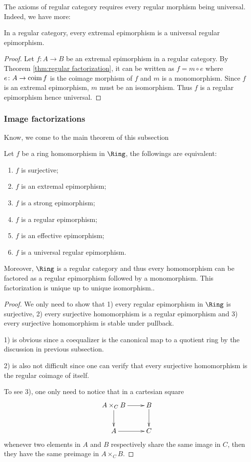   The axioms of regular category requires every regular morphism being universal. Indeed, we have more:
  \begin{cor}\label{cor:regularCat}
    In a regular category, every extremal epimorphism is a universal regular epimorphism.
  \end{cor}
  \begin{proof}
    Let $f\colon A\to B$ be an extremal epimorphism in a regular category. By Theorem \ref{thm:regular factorization}, it can be written as $f=m\circ e$ where $e\colon A\to\operatorname{coim}{f}$ is the coimage morphism of $f$ and $m$ is a monomorphism. Since $f$ is an extremal epimorphism, $m$ must be an isomorphism. Thus $f$ is a regular epimorphism hence universal.
  \end{proof}

\subsubsection{Image factorizations}
  Know, we come to the main theorem of this subsection
  \begin{thm}\label{thm:RingEpi}
    Let $f$ be a ring homomorphism in $\Ring$, the followings are equivalent:
    \begin{enumerate}
      \item $f$ is surjective;
      \item $f$ is an extremal epimorphism;
      \item $f$ is a strong epimorphism;
      \item $f$ is a regular epimorphism;
      \item $f$ is an effective epimorphism;
      \item $f$ is a universal regular epimorphism.
    \end{enumerate}

    Moreover, $\Ring$ is a regular category and thus every homomorphism can be factored as a regular epimorphism followed by a monomorphism. This factorization is unique up to unique isomorphism..
  \end{thm}
  \begin{proof}
    We only need to show that 1) every regular epimorphism in $\Ring$ is surjective, 2) every surjective homomorphism is a regular epimorphism and 3) every surjective homomorphism is stable under pullback.

    1) is obvious since a coequalizer is the canonical map to a quotient ring by the discussion in previous subsection.

    2) is also not difficult since one can verify that every surjective homomorphism is the regular coimage of itself.

    To see 3), one only need to notice that in a cartesian square
    \begin{displaymath}
      \xymatrix{
         A\times_CB\ar[r]\ar[d]&B\ar[d]\\
         A\ar[r]&C
      }
    \end{displaymath}
    whenever two elements in $A$ and $B$ respectively share the same image in $C$, then they have the same preimage in $A\times_CB$.
  \end{proof}

